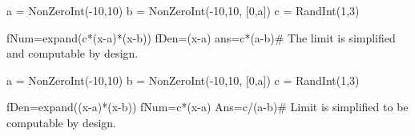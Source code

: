 










\begin{sagesilent}
a = NonZeroInt(-10,10)
b = NonZeroInt(-10,10, [0,a])
c = RandInt(1,3)

fNum=expand(c*(x-a)*(x-b))
fDen=(x-a)
ans=c*(a-b)# The limit is simplified and computable by design.
\end{sagesilent}



\begin{sagesilent}
a = NonZeroInt(-10,10)
b = NonZeroInt(-10,10, [0,a])
c = RandInt(1,3)

fDen=expand((x-a)*(x-b))
fNum=c*(x-a)
Ans=c/(a-b)# Limit is simplified to be computable by design.
\end{sagesilent}

